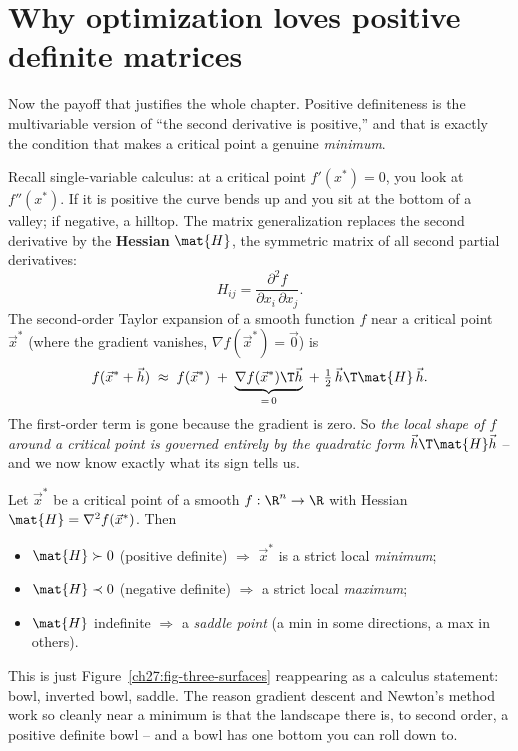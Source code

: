 \section{Why optimization loves positive definite matrices}

Now the payoff that justifies the whole chapter. Positive definiteness is the multivariable version
of ``the second derivative is positive,'' and that is exactly the condition that makes a critical
point a genuine \emph{minimum}.

Recall single-variable calculus: at a critical point $f'(x^*)=0$, you look at $f''(x^*)$. If it is
positive the curve bends up and you sit at the bottom of a valley; if negative, a hilltop. The
matrix generalization replaces the second derivative by the \textbf{Hessian} $\mat{H}$, the
symmetric matrix of all second partial derivatives:
\[
  H_{ij} = \frac{\partial^2 f}{\partial x_i \, \partial x_j}.
\]
The second-order Taylor expansion of a smooth function $f$ near a critical point $\vec{x}^*$ (where
the gradient vanishes, $\nabla f(\vec{x}^*) = \vec{0}$) is
\[
  f(\vec{x}^* + \vec{h}) \;\approx\; f(\vec{x}^*) \;+\; \underbrace{\nabla f(\vec{x}^*)\T \vec{h}}_{=\,0}
  \;+\; \tfrac12\, \vec{h}\T \mat{H}\, \vec{h}.
\]
The first-order term is gone because the gradient is zero. So \emph{the local shape of $f$ around a
critical point is governed entirely by the quadratic form $\vec{h}\T\mat{H}\vec{h}$} -- and we now
know exactly what its sign tells us.

\begin{theorem}
\label{ch27:thm-secondderiv}
Let $\vec{x}^*$ be a critical point of a smooth $f:\R^n\to\R$ with Hessian $\mat{H}=\nabla^2
f(\vec{x}^*)$. Then
\begin{itemize}
  \item $\mat{H}\succ 0$ (positive definite) $\Rightarrow$ $\vec{x}^*$ is a strict local
  \emph{minimum};
  \item $\mat{H}\prec 0$ (negative definite) $\Rightarrow$ a strict local \emph{maximum};
  \item $\mat{H}$ indefinite $\Rightarrow$ a \emph{saddle point} (a min in some directions, a max in
  others).
\end{itemize}
\end{theorem}

This is just Figure~\ref{ch27:fig-three-surfaces} reappearing as a calculus statement: bowl,
inverted bowl, saddle. The reason gradient descent and Newton's method work so cleanly near a
minimum is that the landscape there is, to second order, a positive definite bowl -- and a bowl has
one bottom you can roll down to.

